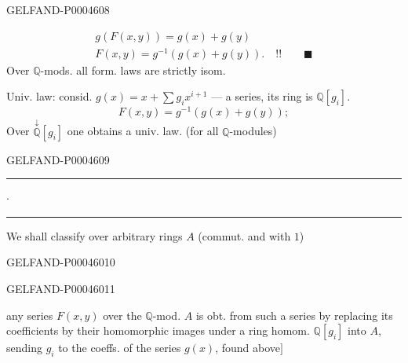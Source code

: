 \begin{GelfandAdjacentEvidence}{GELFAND-P000460}{8}

\[
\begin{gathered}
g(F(x,y))=g(x)+g(y)\\
F(x,y)=g^{-1}(g(x)+g(y)).\quad !!\qquad\blacksquare
\end{gathered}
\]
\quad Over $\mathbb Q$-mods. all form. laws are strictly isom.

Univ. law: consid. $g(x)=x+\sum g_i x^{i+1}$ — a series, its ring is $\mathbb Q[g_i]$.
\[
F(x,y)=g^{-1}(g(x)+g(y));
\]
Over $\overset{\downarrow}{\mathbb Q}[g_i]$ one obtains a univ. law.
(for all $\mathbb Q$-modules)
\end{GelfandAdjacentEvidence}
\begin{GelfandAdjacentEvidence}{GELFAND-P000460}{9}


\begin{center}
\rule[.5ex]{17mm}{.35pt}\enspace$\cdot$\enspace\rule[.5ex]{22mm}{.35pt}
\end{center}

We shall classify over arbitrary rings $A$ (commut. and with $1$)
\end{GelfandAdjacentEvidence}
\begin{GelfandAdjacentEvidence}{GELFAND-P000460}{10}


\end{GelfandAdjacentEvidence}
\begin{GelfandAdjacentEvidence}{GELFAND-P000460}{11}

any series $F(x,y)$ over the $\mathbb Q$-mod. $A$ is obt. from such a series by replacing its coefficients by their homomorphic images under a ring homom.
$\mathbb Q[g_i]$ into $A$, sending $g_i$ to the coeffs. of the series $g(x)$,
found above\(\bigr]\)
\end{GelfandAdjacentEvidence}



